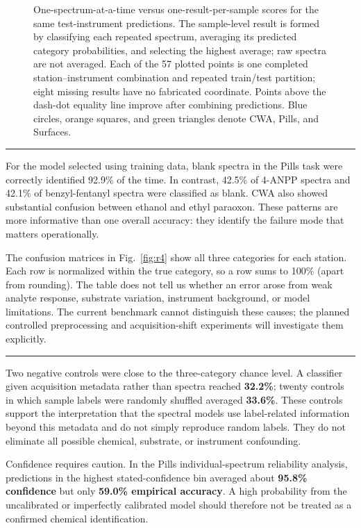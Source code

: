 \documentclass[10pt]{article}
\newcommand{\metric}[1]{\textbf{#1}}
\newcommand{\sectiontitle}[1]{\vspace{2pt}{\large\bfseries #1}\par\vspace{1pt}\hrule\vspace{3pt}}
\begin{document}
\begin{figure}[H]
\centering

\caption{\label{fig:r3}One-spectrum-at-a-time versus one-result-per-sample scores for the same test-instrument predictions. The sample-level result is formed by classifying each repeated spectrum, averaging its predicted category probabilities, and selecting the highest average; raw spectra are not averaged. Each of the 57 plotted points is one completed station--instrument combination and repeated train/test partition; eight missing results have no fabricated coordinate. Points above the dash-dot equality line improve after combining predictions. Blue circles, orange squares, and green triangles denote CWA, Pills, and Surfaces.}
\end{figure}

\sectiontitle{5. Which chemical categories are confused?}
For the model selected using training data, blank spectra in the Pills task were correctly identified 92.9\% of the time. In contrast, 42.5\% of 4-ANPP spectra and 42.1\% of benzyl-fentanyl spectra were classified as blank. CWA also showed substantial confusion between ethanol and ethyl paraoxon. These patterns are more informative than one overall accuracy: they identify the failure mode that matters operationally.

The confusion matrices in Fig.~\ref{fig:r4} show all three categories for each station. Each row is normalized within the true category, so a row sums to 100\% (apart from rounding). The table does not tell us whether an error arose from weak analyte response, substrate variation, instrument background, or model limitations. The current benchmark cannot distinguish these causes; the planned controlled preprocessing and acquisition-shift experiments will investigate them explicitly.

\newpage
\sectiontitle{6. Controls and confidence}
Two negative controls were close to the three-category chance level. A classifier given acquisition metadata rather than spectra reached \metric{32.2\%}; twenty controls in which sample labels were randomly shuffled averaged \metric{33.6\%}. These controls support the interpretation that the spectral models use label-related information beyond this metadata and do not simply reproduce random labels. They do not eliminate all possible chemical, substrate, or instrument confounding.

Confidence requires caution. In the Pills individual-spectrum reliability analysis, predictions in the highest stated-confidence bin averaged about \metric{95.8\% confidence} but only \metric{59.0\% empirical accuracy}. A high probability from the uncalibrated or imperfectly calibrated model should therefore not be treated as a confirmed chemical identification.
\end{document}
